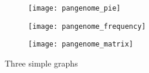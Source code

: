 \begin{figure}[h]	%
     \centering
     \begin{subfigure}[b]{0.45\textwidth}
         \centering
         \texttt{[image: pangenome\_pie]}
         \caption{}
         \label{fig:pangenome pie}
     \end{subfigure}
     \hfill
     \begin{subfigure}[b]{0.45\textwidth}
         \centering
         \texttt{[image: pangenome\_frequency]}
         \caption{}
         \label{fig:pangeome frequency}
     \end{subfigure}
     \hfill
     \begin{subfigure}[b]{0.85\textwidth}
         \centering
         \texttt{[image: pangenome\_matrix]}
         \caption{}
         \label{fig:pangenome matrix}
     \end{subfigure}
        \caption{Three simple graphs}
        \label{fig:pangenome}
\end{figure}



% 





















